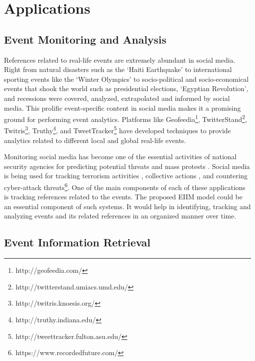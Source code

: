 
\chapter{Applications} %

\label{applications} %


\section{Event Monitoring and Analysis}
References related to real-life events are extremely abundant in social media. Right from natural disasters such as the `Haiti Earthquake' to international sporting events like the `Winter Olympics' to socio-political and socio-economical events that shook the world such as presidential elections, `Egyptian Revolution', and recessions were covered, analyzed, extrapolated and informed by social media. This prolific event-specific content in social media makes it a promising ground for performing event analytics. Platforms like Geofeedia\footnote{http://geofeedia.com/}, TwitterStand\footnote{http://twitterstand.umiacs.umd.edu/}, Twitris\footnote{http://twitris.knoesis.org/}, Truthy\footnote{http://truthy.indiana.edu/}, and TweetTracker\footnote{http://tweettracker.fulton.asu.edu/}  have developed techniques to provide analytics related to different local and global real-life events. 

Monitoring social media has become one of the essential activities of national security agencies for predicting potential threats and mass protests \cite{ghannam2011social}. Social media is being used for tracking terrorism activities \cite{oh2011information}, collective actions \cite{agarwal2014online}, and countering cyber-attack threats\footnote{https://www.recordedfuture.com/}. One of the main components of each of these applications is tracking references related to the events. The proposed EIIM model could be an essential component of such systems. It would help in identifying, tracking and analyzing events and its related references in an organized manner over time.





\section{Event Information Retrieval}

